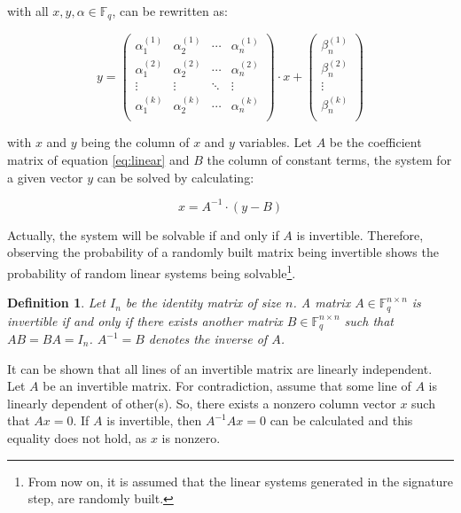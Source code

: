 \documentclass{ufsctex/ufsctex}
\newtheorem{definition}{Definition}
\begin{document}
with all $x, y, \alpha \in \mathbb{F}_q$, can be rewritten as:

\begin{equation}\label{eq:linear}
y =
\begin{pmatrix}
\alpha^{(1)}_1 & \alpha^{(1)}_2 & \cdots & \alpha^{(1)}_n \\
\alpha^{(2)}_1 & \alpha^{(2)}_2 & \cdots & \alpha^{(2)}_n \\
\vdots & \vdots & \ddots & \vdots \\
\alpha^{(k)}_1 & \alpha^{(k)}_2 & \cdots & \alpha^{(k)}_n \\
\end{pmatrix}
\cdot x +
\begin{pmatrix}
\beta^{(1)}_n \\
\beta^{(2)}_n \\
\vdots \\
\beta^{(k)}_n \\
\end{pmatrix}
\end{equation}

with $x$ and $y$ being the column of $x$ and $y$ variables. Let $A$ be the
coefficient matrix of equation \ref{eq:linear} and $B$ the column of constant
terms, the system for a given vector $y$ can be solved by calculating:

\begin{equation}
x = A^{-1} \cdot (y - B)
\end{equation}

Actually, the system will be solvable if and only if $A$ is invertible.
Therefore, observing the probability of a randomly built matrix being
invertible shows the probability of random linear systems being
solvable\footnote{From now on, it is assumed that the linear systems generated
in the signature step, are randomly built.}.

\begin{definition}
Let $I_n$ be the identity matrix of size $n$. A matrix $A \in \mathbb{F}^{n
\times n}_q$ is invertible if and only if there exists another matrix $B \in
\mathbb{F}^{n \times n}_q$ such that $AB = BA = I_n$. $A^{-1} = B$ denotes the
inverse of $A$.
\end{definition}

It can be shown that all lines of an invertible matrix are linearly
independent. Let $A$ be an invertible matrix. For contradiction, assume that
some line of $A$ is linearly dependent of other(s). So, there exists a nonzero
column vector $x$ such that $Ax = 0$. If $A$ is invertible, then $A^{-1}Ax = 0$
can be calculated and this equality does not hold, as $x$ is nonzero.
\end{document}
